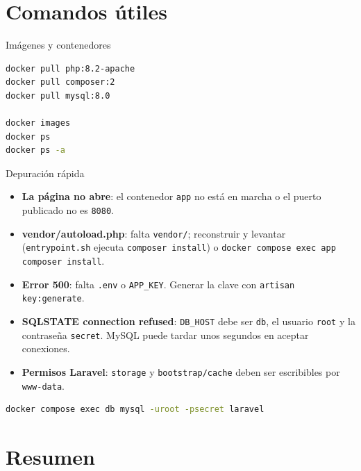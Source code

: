 \documentclass[aspectratio=169,10pt]{beamer}
\begin{document}
\section{Comandos útiles}

\begin{frame}[fragile]{Imágenes y contenedores}
\begin{lstlisting}[language=bash]
docker pull php:8.2-apache
docker pull composer:2
docker pull mysql:8.0

docker images
docker ps
docker ps -a
\end{lstlisting}
\end{frame}

\begin{frame}[fragile]{Depuración rápida}
  \begin{itemize}
    \item \textbf{La página no abre}: el contenedor \texttt{app} no está en marcha o el puerto publicado no es \texttt{8080}.
    \item \textbf{vendor/autoload.php}: falta \texttt{vendor/}; reconstruir y levantar (\texttt{entrypoint.sh} ejecuta \texttt{composer install}) o \texttt{docker compose exec app composer install}.
    \item \textbf{Error 500}: falta \texttt{.env} o \texttt{APP\_KEY}. Generar la clave con \texttt{artisan key:generate}.
    \item \textbf{SQLSTATE connection refused}: \texttt{DB\_HOST} debe ser \texttt{db}, el usuario \texttt{root} y la contraseña \texttt{secret}. MySQL puede tardar unos segundos en aceptar conexiones.
    \item \textbf{Permisos Laravel}: \texttt{storage} y \texttt{bootstrap/cache} deben ser escribibles por \texttt{www-data}.
  \end{itemize}
\begin{lstlisting}[language=bash]
docker compose exec db mysql -uroot -psecret laravel
\end{lstlisting}
\end{frame}

\section{Resumen}
\end{document}
